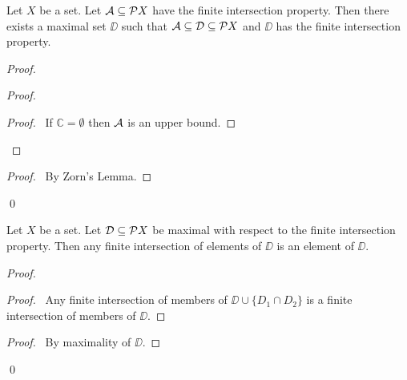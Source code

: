 \begin{lemma}
    \label{lemma:maximal_finite_intersection_property}
    Let $X$ be a set. Let $\AA \subseteq \pow X$ have the finite intersection property.
    Then there exists a maximal set $\DD$ such that $\AA \subseteq \DD \subseteq \pow X$
    and $\DD$ has the finite intersection property.
\end{lemma}

\begin{proof}
    \pf
    \begin{proof}
        \begin{proof}
            \pf\ If $\mathbb{C} = \emptyset$ then $\AA$ is an upper bound.
        \end{proof}
    \end{proof}
    \qedstep
    \begin{proof}
        \pf\ By Zorn's Lemma.
    \end{proof}
    \qed
\end{proof}

\begin{lemma}
    \label{lemma:finite_intersection_maximal}
    Let $X$ be a set. Let $\DD \subseteq \pow X$ be maximal with respect to the finite intersection property.
    Then any finite intersection of elements of $\DD$ is an element of $\DD$.
\end{lemma}

\begin{proof}
    \pf
    \begin{proof}
        \pf\ Any finite intersection of members of $\DD \cup \{ D_1 \cap D_2 \}$
        is a finite intersection of members of $\DD$.
    \end{proof}
    \begin{proof}
        \pf\ By maximality of $\DD$.
    \end{proof}
    \qed
\end{proof}

